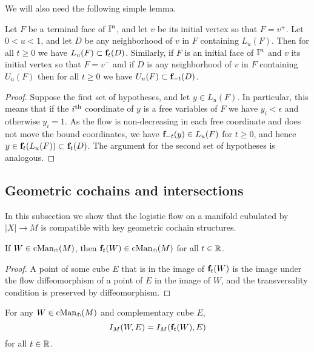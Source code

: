 We will also need the following simple lemma.

\begin{lemma}\label{L: domain flow}
	Let $F$ be a terminal face of $\mathbb{I}^n$, and let $v$ be its initial vertex so that $F=v^+$. Let $0<u<1$, and let $D$ be any neighborhood of $v$ in $F$ containing $L_u(F)$. Then for all $t\geq 0$ we have $L_u(F)\subset \mathbf{f}_t(D)$. Similarly, if $F$ is an initial face of $\mathbb{I}^n$ and $v$ its initial vertex so that $F=v^-$ and if $D$ is any neighborhood of $v$ in $F$ containing $U_u(F)$ then for all $t\geq 0$ we have $U_u(F)\subset \mathbf{f}_{-t}(D)$.
\end{lemma}

\begin{proof}
	Suppose the first set of hypotheses, and let $y\in L_u(F)$. In particular, this means that if the $i^{\mathrm{th}}$ coordinate of $y$ is a free variables of $F$ we have $y_i<\epsilon$ and otherwise $y_i=1$. As the flow is non-decreasing in each free coordinate and does not move the bound coordinates, we have $\mathbf{f}_{-t}(y)\in L_u(F)$ for $t\geq 0$, and hence $y\in \mathbf{f}_t(L_u(F))\subset \mathbf{f}_t(D)$. The argument for the second set of hypotheses is analogous.
\end{proof}

\subsection{Geometric cochains and intersections}

In this subsection we show that the logistic flow on a manifold cubulated by $|X| \to M$ is compatible with key geometric cochain structures.

\begin{lemma} \label{l:flow preserves transversality}
	If $W \in \mathrm{cMan}_{\pitchfork}(M)$, then $\mathbf{f}_t(W)\in \mathrm{cMan}_{\pitchfork}(M)$ for all $t \in \mathbb{R}$.
\end{lemma}

\begin{proof}
	A point of some cube $E$ that is in the image of $\mathbf{f}_t(W)$ is the image under the flow diffeomorphism of a point of $E$ in the image of $W$, and the transversality condition is preserved by diffeomorphism.
\end{proof}

\begin{lemma}
	For any $W \in \mathrm{cMan}_{\pitchfork}(M)$ and complementary cube $E$,
	\begin{equation*}
	I_M(W, E) = I_M(\mathbf{f}_t(W), E)
	\end{equation*}
	for all $t \in \mathbb{R}$.
\end{lemma}

